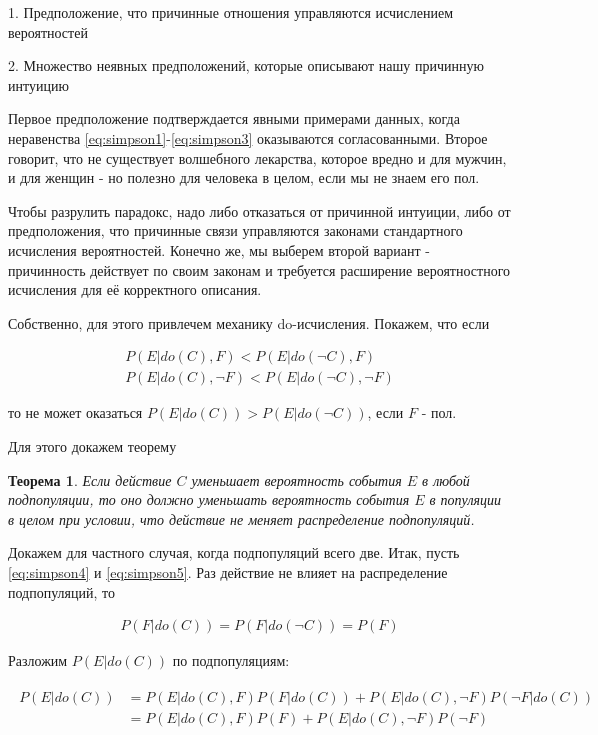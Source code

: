 \documentclass[fleqn]{article}
\newtheorem{theorem}{Теорема}
\numberwithin{equation}{section}
\numberwithin{theorem}{section}
\numberwithin{figure}{section}
\numberwithin{lemma}{section}
\numberwithin{corollary}{section}
\begin{document}
1. Предположение, что причинные отношения управляются исчислением вероятностей

2. Множество неявных предположений, которые описывают нашу причинную интуицию

Первое предположение подтверждается явными примерами данных, когда неравенства \ref{eq:simpson1}-\ref{eq:simpson3} оказываются согласованными. Второе говорит, что не существует волшебного лекарства, которое вредно и для мужчин, и для женщин - но полезно для человека в целом, если мы не знаем его пол.

Чтобы разрулить парадокс, надо либо отказаться от причинной интуиции, либо от предположения, что причинные связи управляются законами стандартного исчисления вероятностей. Конечно же, мы выберем второй вариант - причинность действует по своим законам и требуется расширение вероятностного исчисления для её корректного описания.

Собственно, для этого привлечем механику do-исчисления. Покажем, что если 

\begin{align}
	P(E| do(C), F) < P(E|do(\neg C), F) \label{eq:simpson4}\\
	P(E| do(C), \neg F) < P(E|do(\neg C), \neg F)\label{eq:simpson5}
\end{align} 

то не может оказаться $P(E| do(C)) > P(E| do(\neg C))$, если $F$ - пол.

Для этого докажем теорему 
\begin{theorem}
	Если действие $C$ уменьшает вероятность события $E$ в любой подпопуляции, то оно должно уменьшать вероятность события $E$ в популяции в целом при условии, что действие не меняет распределение подпопуляций.
\end{theorem}

Докажем для частного случая, когда подпопуляций всего две. Итак, пусть \ref{eq:simpson4} и \ref{eq:simpson5}. Раз действие не влияет на распределение подпопуляций, то 

\begin{align}
	P(F|do(C)) = P(F|do(\neg C)) = P(F)
\end{align}

Разложим $P(E|do(C))$ по подпопуляциям:

\begin{align}
	\begin{split}
	P(E|do(C)) &= P(E|do(C),F)P(F|do(C)) + P(E|do(C),\neg F)P(\neg F| do(C)) \\
	&= P(E|do(C),F)P(F) + P(E|do(C),\neg F)P(\neg F)
\end{split}
\end{align}
\end{document}
